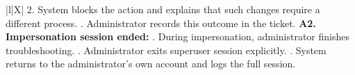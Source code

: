 \begin{xltabular}{\textwidth}{|l|X|}
        2. System blocks the action and explains that such changes require a different process. . Administrator records this outcome in the ticket. \newline
        \textbf{A2. Impersonation session ended:} . During impersonation, administrator finishes troubleshooting. . Administrator exits superuser session explicitly. . System returns to the administrator’s own account and logs the full session. \\ \hline
\end{xltabular}

